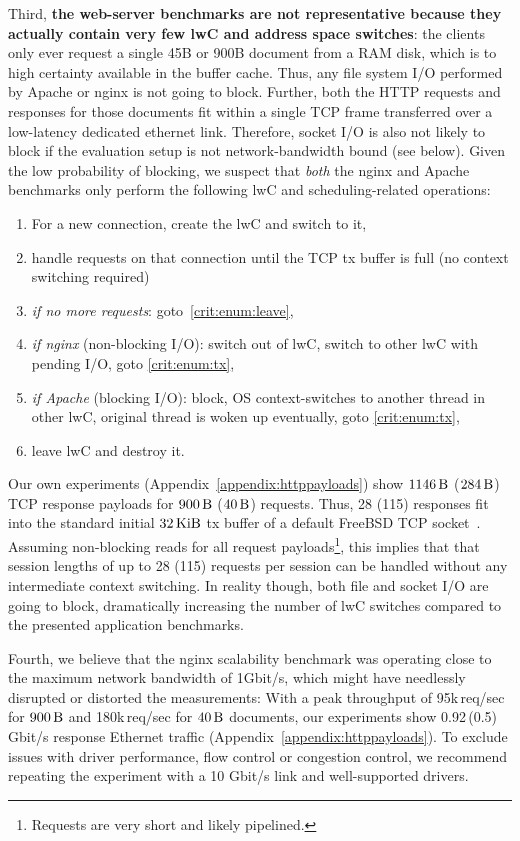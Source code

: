 \documentclass[10pt,twocolumn,a4paper]{article}
\begin{document}
Third, \textbf{the web-server benchmarks are not representative because they actually contain very few lwC and address space switches}:
the clients only ever request a single 45B or 900B document from a RAM disk, which is to high certainty available in the buffer cache.
Thus, any file system I/O performed by Apache or nginx is not going to block.
Further, both the HTTP requests and responses for those documents fit within a single TCP frame transferred over a low-latency dedicated ethernet link.
Therefore, socket I/O is also not likely to block if the evaluation setup is not network-bandwidth bound (see below).
Given the low probability of blocking, we suspect that \textit{both} the nginx and Apache benchmarks only perform the following lwC and scheduling-related operations:
\begin{enumerate}[nosep]
\item For a new connection, create the lwC and switch to it,
\item\label{crit:enum:tx} handle requests on that connection until the TCP tx buffer is full (no context switching required)
\item \textit{if no more requests}: goto~\ref{crit:enum:leave},
\item \textit{if nginx} (non-blocking I/O): switch out of lwC, switch to other lwC with pending I/O, goto \ref{crit:enum:tx},
\item \textit{if Apache} (blocking I/O): block, OS context-switches to another thread in other lwC, original thread is woken up eventually, goto \ref{crit:enum:tx},
\item\label{crit:enum:leave} leave lwC and destroy it.
\end{enumerate}
Our own experiments (Appendix~\ref{appendix:httppayloads}) show $\SI{1146}{\byte}$ ($\SI{284}{\byte}$) TCP response payloads for $\SI{900}{\byte}$ ($\SI{40}{\byte}$) requests.
Thus, 28 (115) responses fit into the standard initial $\SI{32}{\kibi\byte}$ tx buffer of a default FreeBSD TCP socket~\cite{fbsd11tcpsendspace}.
Assuming non-blocking reads for all request payloads\footnote{Requests are very short and likely pipelined.}, this implies that that session lengths of up to 28 (115) requests per session can be handled without any intermediate context switching.
In reality though, both file and socket I/O are going to block, dramatically increasing the number of lwC switches compared to the presented application benchmarks.

Fourth, we believe that the nginx scalability benchmark was operating close to the maximum network bandwidth of 1Gbit/s, which might have needlessly disrupted or distorted the measurements:
With a peak throughput of 95k\,req/sec for $\SI{900}{\byte}$ and 180k\,req/sec for $\SI{40}{\byte}$ documents, our experiments show 0.92\,(0.5)\,Gbit/s response Ethernet traffic (Appendix~\ref{appendix:httppayloads}).
To exclude issues with driver performance, flow control or congestion control, we recommend repeating the experiment with a 10 Gbit/s link and well-supported drivers.
\end{document}
